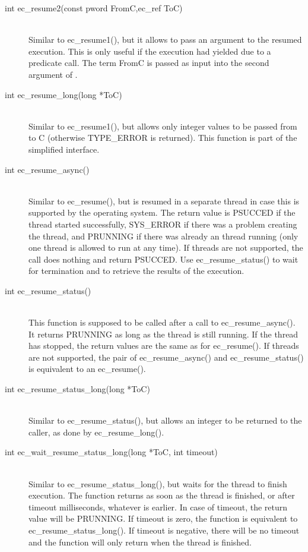 \begin{description}
\item[int		ec_resume2(const pword FromC,ec_ref ToC)]\ \\
	Similar to ec_resume1(), but it allows to pass an argument
	to the resumed execution. This is only useful if the execution
	had yielded due to a
	predicate call. The term FromC is passed as input into the
	second argument of
	.

\item[int		ec_resume_long(long *ToC)]\ \\
	Similar to ec_resume1(), but allows only integer values to be passed
	from {\eclipse} to C (otherwise TYPE_ERROR is returned).
	This function is part of the simplified interface.

\item[int		ec_resume_async()]\ \\
	Similar to ec_resume(), but {\eclipse} is resumed in a separate
	thread in case this is supported by the operating system.
	The return value is PSUCCED if the thread started successfully,
	SYS_ERROR if there was a problem creating the thread, and
	PRUNNING if there was already an {\eclipse} thread running
	(only one {\eclipse} thread is allowed to run at any time).
	If threads are not supported, the call does nothing and return
	PSUCCED. Use ec_resume_status() to wait for termination and
	to retrieve the results of the execution.

\item[int		ec_resume_status()]\ \\
	This function is supposed to be called after a call to
	ec_resume_async(). It returns PRUNNING as long as the {\eclipse}
	thread is still running. If the thread has stopped, the return
	values are the same as for ec_resume().
	If threads are not supported, the pair of ec_resume_async()
	and ec_resume_status() is equivalent to an ec_resume().

\item[int		ec_resume_status_long(long *ToC)]\ \\
	Similar to ec_resume_status(), but allows an integer to be
	returned to the caller, as done by ec_resume_long().

\item[int		ec_wait_resume_status_long(long *ToC, int timeout)]\ \\
	Similar to ec_resume_status_long(), but waits for the {\eclipse} thread
	to finish execution. The function returns as soon as the {\eclipse} thread
	is finished, or after timeout milliseconds, whatever is earlier.
	In case of timeout, the return value will be PRUNNING. If timeout is
	zero, the function is equivalent to ec_resume_status_long().
	If timeout is negative, there will be no timeout and the function
	will only return when the {\eclipse} thread is finished.


\end{description}
